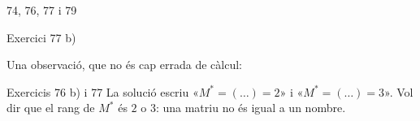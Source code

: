 
%
        {74, 76, 77 i 79}

\begin{errada}{Exercici 77 b)}
\end{errada}


\ifobs
\bigskip
\noindent
Una observació, que no és cap errada de càlcul:\par\nopagebreak

\begin{observacio}{Exercicis 76 b) i 77}
  La solució escriu «$M^*=(\ldots)=2$» i «$M^*=(\ldots)=3$». Vol dir que el
  rang de $M^*$ és $2$ o $3$: una matriu no és igual a un nombre.
\end{observacio}
\fi
